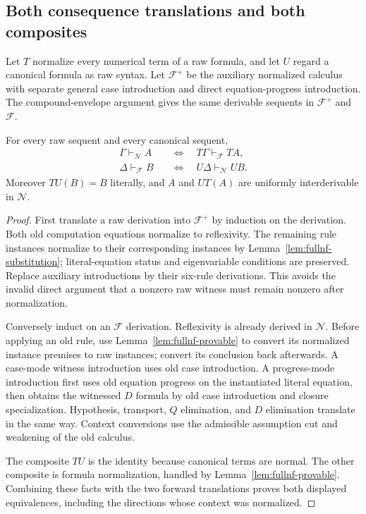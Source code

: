 \subsection{Both consequence translations and both composites}

Let $T$ normalize every numerical term of a raw formula, and let $U$ regard
a canonical formula as raw syntax.  Let $\mathcal F^+$ be the auxiliary
normalized calculus with separate general case introduction and direct
equation-progress introduction.  The compound-envelope argument gives
the same derivable sequents in $\mathcal F^+$ and $\mathcal F$.

\begin{theorem}
\label{thm:fullnf-comparison}
For every raw sequent and every canonical sequent,
\begin{align*}
 \Gamma\vdash_{\mathcal N}A
   &\quad\Longleftrightarrow\quad
       T\Gamma\vdash_{\mathcal F}TA,\\
 \Delta\vdash_{\mathcal F}B
   &\quad\Longleftrightarrow\quad
       U\Delta\vdash_{\mathcal N}UB.
\end{align*}
Moreover $TU(B)=B$ literally, and $A$ and $UT(A)$ are uniformly
interderivable in $\mathcal N$.
\end{theorem}
\begin{proof}
First translate a raw derivation into $\mathcal F^+$ by induction on the
derivation.  Both old computation equations normalize to reflexivity.
The remaining rule instances normalize to their corresponding instances
by Lemma~\ref{lem:fullnf-substitution}; literal-equation status and
eigenvariable conditions are preserved.  Replace auxiliary introductions
by their six-rule derivations.  This avoids the invalid direct argument
that a nonzero raw witness must remain nonzero after normalization.

Conversely induct on an $\mathcal F$ derivation.  Reflexivity is already
derived in $\mathcal N$.  Before applying an old rule, use
Lemma~\ref{lem:fullnf-provable} to convert its normalized instance premises
to raw instances; convert its conclusion back afterwards.  A case-mode
witness introduction uses old case introduction.  A progress-mode
introduction first uses old equation progress on the instantiated literal
equation, then obtains the witnessed $D$ formula by old case introduction
and closure specialization.  Hypothesis, transport, $Q$ elimination, and
$D$ elimination translate in the same way.  Context conversions use the
admissible assumption cut and weakening of the old calculus.

The composite $TU$ is the identity because canonical terms are normal.
The other composite is formula normalization, handled by
Lemma~\ref{lem:fullnf-provable}.  Combining these facts with the two forward
translations proves both displayed equivalences, including the directions
whose context was normalized.
\end{proof}


